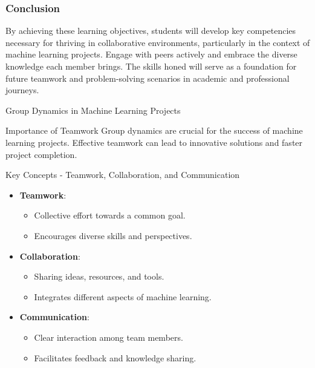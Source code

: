 \documentclass[aspectratio=169]{beamer}
\begin{document}
\begin{frame}[fragile]
    \frametitle{Conclusion}
    By achieving these learning objectives, students will develop key competencies necessary for thriving in collaborative environments, 
    particularly in the context of machine learning projects. Engage with peers actively and embrace the diverse knowledge each member brings. 
    The skills honed will serve as a foundation for future teamwork and problem-solving scenarios in academic and professional journeys.
\end{frame}

\begin{frame}[fragile]{Group Dynamics in Machine Learning Projects}
  \begin{block}{Importance of Teamwork}
    Group dynamics are crucial for the success of machine learning projects. Effective teamwork can lead to innovative solutions and faster project completion.
  \end{block}
\end{frame}

\begin{frame}[fragile]{Key Concepts - Teamwork, Collaboration, and Communication}
  \begin{itemize}
    \item \textbf{Teamwork}:
      \begin{itemize}
        \item Collective effort towards a common goal.
        \item Encourages diverse skills and perspectives.
      \end{itemize}
  
    \item \textbf{Collaboration}:
      \begin{itemize}
        \item Sharing ideas, resources, and tools.
        \item Integrates different aspects of machine learning.
      \end{itemize}
  
    \item \textbf{Communication}:
      \begin{itemize}
        \item Clear interaction among team members.
        \item Facilitates feedback and knowledge sharing.
      \end{itemize}
  \end{itemize}
\end{frame}
\end{document}
